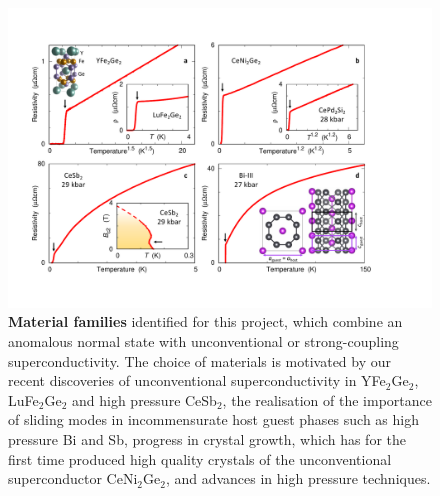\begin{figure}[t]
     \centerline{\includegraphics[width=1.7\columnwidth]{Figures/NewSuperconductors/NewSuperconFig}}

   \caption{{\bf Material families} identified for this project, which combine an anomalous normal state %
   with unconventional or strong-coupling superconductivity. The choice of materials is motivated by our recent discoveries of unconventional superconductivity in YFe$_2$Ge$_2$, LuFe$_2$Ge$_2$ and high pressure CeSb$_2$, the realisation of the importance of sliding modes in incommensurate host guest phases such as high pressure Bi \protect{} and Sb,  progress in crystal growth, which has for the first time  produced high quality crystals of the unconventional superconductor CeNi$_2$Ge$_2$, and advances in high pressure techniques. }%
    \label{fig:Materials}
\end{figure}

